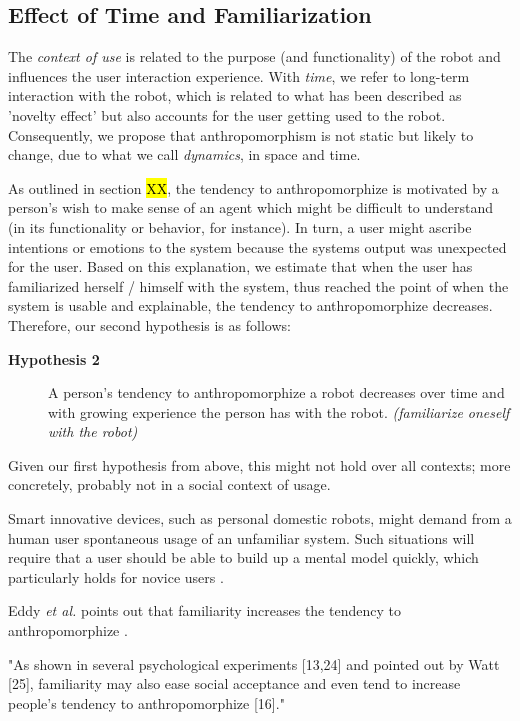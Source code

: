 \documentclass[lettersize, apacite, twoside, HRI]{apa_HRI}
\begin{document}
\subsection{Effect of Time and Familiarization}
\label{sec:8.2}

	The \textit{context of use} is related to the purpose (and functionality) of the robot and influences the user interaction experience. With \textit{time}, we refer to long-term interaction with the robot, which is related to what has been described as 'novelty effect' but also accounts for the user getting used to the robot. Consequently, we propose that anthropomorphism is not static but likely to change, due to what we call \textit{dynamics}, in space and time.


	As outlined in section \hl{XX}, the tendency to anthropomorphize is motivated by a person's wish to make sense of an agent which might be difficult to understand (in its functionality or behavior, for instance). In turn, a user might ascribe intentions or emotions to the system because the systems output was unexpected for the user. Based on this explanation, we estimate that when the user has familiarized herself / himself with the system, thus reached the point of when the system is usable and explainable, the tendency to anthropomorphize decreases. Therefore, our second hypothesis is as follows: 

\begin{description}
	\item[\textbf{Hypothesis 2}] A person's tendency to anthropomorphize a robot decreases over time and with growing experience the person has with the robot. \textit{(familiarize oneself with the robot)}
\end{description}	
	

Given our first hypothesis from above, this might not hold over all contexts; more concretely, probably not in a social context of usage.


	Smart innovative devices, such as personal domestic robots, might demand from a human user spontaneous usage of an unfamiliar system. Such situations will require that a user should be able to build up a mental model quickly, which particularly holds for novice users \cite{schmitz_concepts_2011}.

	Eddy \textit{et al.} points out that familiarity increases the tendency to anthropomorphize \cite{eddy_attribution_1993}.

	"As shown in several psychological experiments [13,24] and pointed out by Watt [25], familiarity may also ease social acceptance and even tend to increase people's tendency to anthropomorphize [16]." \cite{duffy_anthropomorphism_2003}
\end{document}
